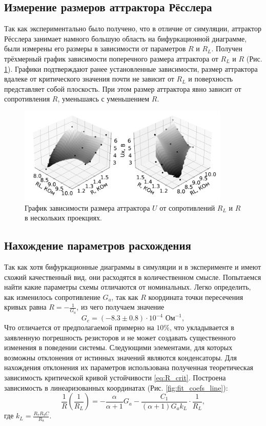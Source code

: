 \documentclass[12pt]{article}
\begin{document}
\subsection*{Измерение размеров аттрактора Рёсслера}
Так как экспериментально было получено, что в отличие от симуляции, аттрактор
Рёсслера занимает намного большую область на бифуркационной диаграмме, были измерены
его размеры в зависимости от параметров $R$ и $R_L$. Получен трёхмерный график зависимости 
поперечного размера аттрактора от $R_L$ и $R$ (Рис. \ref{fig:Ressler_amplitudes}). Графики подтверждают ранее 
установленные зависимости, размер аттрактора вдалеке от критического значения почти не зависит от $R_L$ и поверхность 
представляет собой плоскость. При этом размер аттрактора явно зависит от сопротивления $R$, уменьшаясь с уменьшением $R$. 

\begin{figure}[H]
	\centering
	\includegraphics[width=0.9\textwidth]{3D_size_view.pdf}
	\caption{График зависимости размера аттрактора $U$ от сопротивлений $R_L$ и $R$ в нескольких проекциях.}
	\label{fig:Ressler_amplitudes}
\end{figure}


\subsection*{Нахождение параметров расхождения}
Так как хотя бифуркационные диаграммы в симуляции и в эксперименте и имеют схожий качественный вид, они
расходятся в количественном смысле. Попытаемся найти какие параметры схемы отличаются от номинальных.
Легко определить, как изменилось сопротивление $G_a$, так как $R$ координата точки пересечения кривых
равна $R = -\frac{1}{G_a}$, из чего получаем значение
\[
	G_e = (-8.3 \pm 0.8) \cdot 10^{-4} \text{ Ом}^{-1},
\]
Что отличается от предполагаемой примерно на $10\%$, что укладывается в заявленную погрешность резисторов и
не может создавать существенного изменения в поведении системы.
Следующими элементами, для которых возможны отклонения от истинных значений являются конденсаторы.
Для нахождения отклонения их параметров использована полученная теоретическая зависимость критической кривой устойчивости \ref{eq:R_crit}.
Построена зависимость в линеаризованных координатах (Рис. \ref{fig:fit_coefs_line}):
\[
	\frac{1}{R} \left( \frac{1}{R_L} \right) = -\frac{\alpha}{\alpha + 1} G_a - \frac{C_1}{(\alpha + 1) G_a k_L} \cdot \frac{1}{R_L},
\]
где $k_L = \frac{R_7 R_9 C}{R_8}$.
\end{document}
